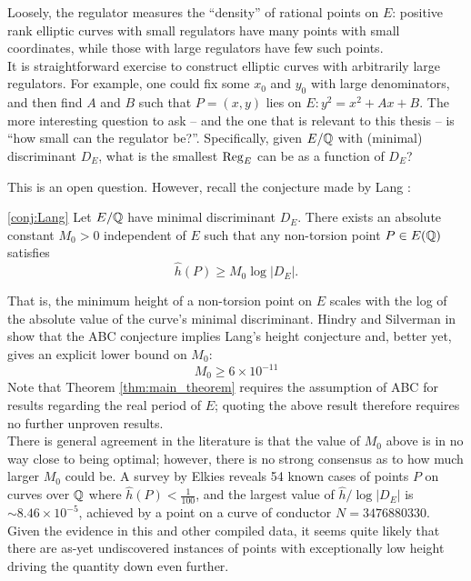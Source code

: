 Loosely, the regulator measures the ``density'' of rational points on $E$: positive rank elliptic curves with small regulators have many points with small coordinates, while those with large regulators have few such points.\\

It is straightforward exercise to construct elliptic curves with arbitrarily large regulators. For example, one could fix some $x_0$ and $y_0$ with large denominators, and then find $A$ and $B$ such that $P=(x,y)$ lies on $E: y^2 = x^2 + Ax + B$. The more interesting question to ask -- and the one that is relevant to this thesis -- is ``how small can the regulator be?''. Specifically, given $E/\mathbb{Q}$ with (minimal) discriminant $D_E$, what is the smallest $\operatorname{Reg}_E$ can be as a function of $D_E$?

This is an open question. However, recall the conjecture made by Lang \cite{Lang-1997}:
\begin{quotedconjecture}{\ref{conj:Lang}}
Let $E/\mathbb{Q}$ have minimal discriminant $D_E$. There exists an absolute constant $M_0 >0$ independent of $E$ such that any non-torsion point $P \in E(\mathbb{Q})$ satisfies
\begin{equation}
\hat{h}(P) \ge M_0 \log |D_E| .
\end{equation}
\end{quotedconjecture}
That is, the minimum height of a non-torsion point on $E$ scales with the log of the absolute value of the curve's minimal discriminant. Hindry and Silverman in \cite{HiS-1988} show that the ABC conjecture implies Lang's height conjecture and, better yet, gives an explicit lower bound on $M_0$:
\begin{equation}
M_0 \ge 6\times 10^{-11}
\end{equation}
Note that Theorem \ref{thm:main_theorem} requires the assumption of ABC for results regarding the real period of $E$; quoting the above result therefore requires no further unproven results. \\

There is general agreement in the literature is that the value of $M_0$ above is in no way close to being optimal; however, there is no strong consensus as to how much larger $M_0$ could be. A survey by Elkies \cite{ElSt-2002} reveals 54 known cases of points $P$ on curves over $\mathbb{Q}$ where $\hat{h}(P) < \frac{1}{100}$, and the largest value of $\hat{h}/\log|D_E|$ is $\sim 8.46 \times 10^{-5}$, achieved by a point on a curve of conductor $N=3476880330$. Given the evidence in this and other compiled data, it seems quite likely that there are as-yet undiscovered instances of points with exceptionally low height driving the quantity down even further. \\

